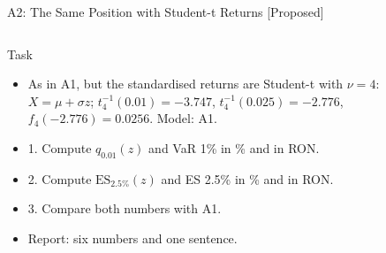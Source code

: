 \begin{frame}{A2: The Same Position with Student-t Returns [Proposed]}
\propsub
\itemsize{\scriptsize}
\begin{columns}[T]
\begin{column}{\taskw}
\begin{block}{Task}
\begin{itemize}
    \item As in A1, but the standardised returns are Student-t with $\nu = 4$: $X = \mu + \sigma z$; $t_4^{-1}(0.01) = -3.747$, $t_4^{-1}(0.025) = -2.776$, $f_4(-2.776) = 0.0256$. Model: A1.
    \item 1. Compute $q_{0.01}(z)$ and VaR 1\% in \% and in RON.
    \item 2. Compute $\mathrm{ES}_{2.5\%}(z)$ and ES 2.5\% in \% and in RON.
    \item 3. Compare both numbers with A1.
    \item Report: six numbers and one sentence.
\end{itemize}
\end{block}
\end{column}
\begin{column}{\solw}
\end{column}
\end{columns}
\end{frame}

